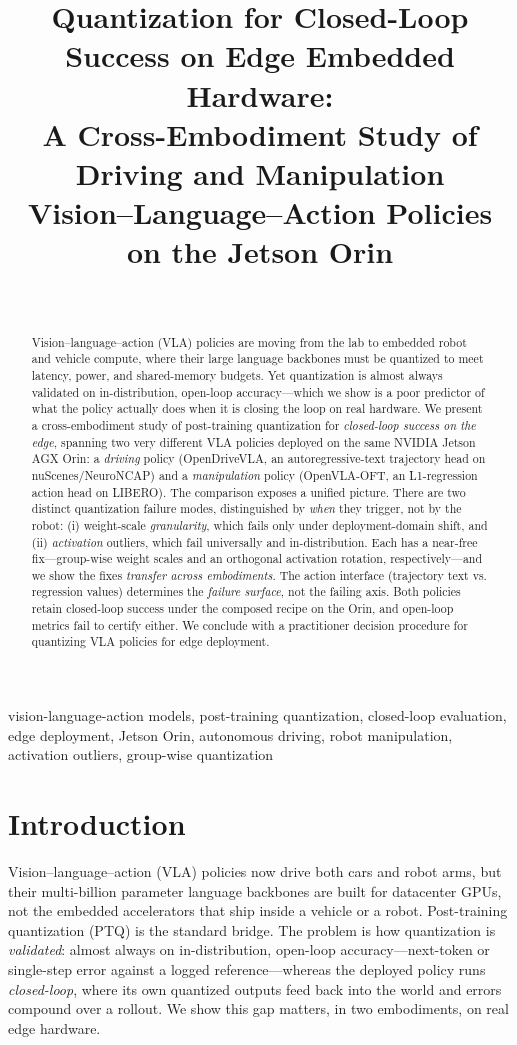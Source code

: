 \documentclass[conference]{IEEEtran}
\title{\textbf{Quantization for Closed-Loop Success on Edge Embedded Hardware:\\
A Cross-Embodiment Study of Driving and Manipulation\\
Vision--Language--Action Policies on the Jetson Orin}}
\author{
\IEEEauthorblockN{Justin Williams$^{1}$, Kishor Datta Gupta$^{2}$, Roy George$^{3}$, and Mrinmoy Sarkar$^{4}$
}\\
\IEEEauthorblockA{Department of Cyber-Physical Systems, Clark Atlanta University, Atlanta, GA, USA\\
$^{1}$\textit{justin.williams1@students.cau.edu},
$^{2}$\textit{kgupta@cau.edu},
$^{3}$\textit{rgeorge@cau.edu}}
\IEEEauthorblockA{Siemens Corporation, Princeton, NJ, USA\\
$^{4}$\textit{mrinmoy.sarkar@siemens.com}}
}
\begin{document}
\maketitle

\begin{abstract}
Vision--language--action (VLA) policies are moving from the lab to embedded robot and vehicle
compute, where their large language backbones must be quantized to meet latency, power, and
shared-memory budgets. Yet quantization is almost always validated on in-distribution, open-loop
accuracy---which we show is a poor predictor of what the policy actually does when it is closing the
loop on real hardware. We present a cross-embodiment study of post-training quantization for
\emph{closed-loop success on the edge}, spanning two very different VLA policies deployed on the same
NVIDIA Jetson AGX Orin: a \emph{driving} policy (OpenDriveVLA, an autoregressive-text trajectory head
on nuScenes/NeuroNCAP) and a \emph{manipulation} policy (OpenVLA-OFT, an L1-regression action head on
LIBERO). The comparison exposes a unified picture. There are two distinct quantization failure modes,
distinguished by \emph{when} they trigger, not by the robot: (i) weight-scale \emph{granularity},
which fails only under deployment-domain shift, and (ii) \emph{activation} outliers, which fail
universally and in-distribution. Each has a near-free fix---group-wise weight scales and an orthogonal
activation rotation, respectively---and we show the fixes \emph{transfer across embodiments}. The
action interface (trajectory text vs. regression values) determines the \emph{failure surface}, not
the failing axis. Both policies retain closed-loop success under the composed recipe on the Orin, and
open-loop metrics fail to certify either. We conclude with a practitioner decision procedure for
quantizing VLA policies for edge deployment.
\end{abstract}
\begin{IEEEkeywords}
vision-language-action models, post-training quantization, closed-loop evaluation, edge deployment,
Jetson Orin, autonomous driving, robot manipulation, activation outliers, group-wise quantization
\end{IEEEkeywords}

\section{Introduction}
Vision--language--action (VLA) policies now drive both cars and robot arms, but their multi-billion
parameter language backbones are built for datacenter GPUs, not the embedded accelerators that ship
inside a vehicle or a robot. Post-training quantization (PTQ) is the standard bridge. The problem is
how quantization is \emph{validated}: almost always on in-distribution, open-loop accuracy---next-token
or single-step error against a logged reference---whereas the deployed policy runs \emph{closed-loop},
where its own quantized outputs feed back into the world and errors compound over a rollout. We show
this gap matters, in two embodiments, on real edge hardware.
\end{document}
